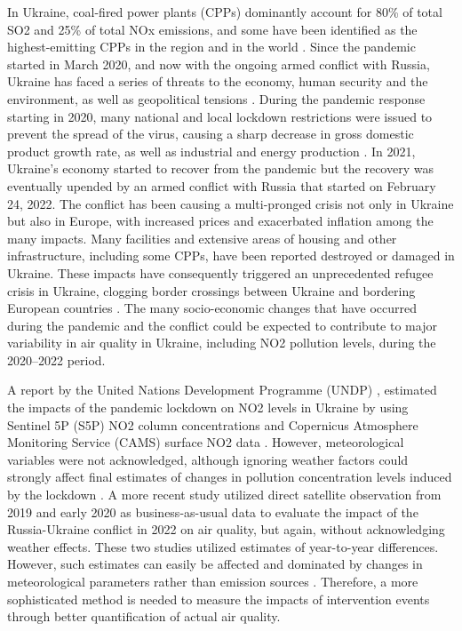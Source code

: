 In Ukraine, coal-fired power plants (CPPs) dominantly account for 80\% of total SO2 and 25\% of total NOx emissions, and some have been identified as the highest-emitting CPPs in the region and in the world \citep{lauri2021}. Since the pandemic started in March 2020, and now with the ongoing armed conflict with Russia, Ukraine has faced a series of threats to the economy, human security and the environment, as well as geopolitical tensions \citep{pereira2022russian}. During the pandemic response starting in 2020, many national and local lockdown restrictions were issued to prevent the spread of the virus, causing a sharp decrease in gross domestic product growth rate, as well as industrial and energy production \citep{danylyshyn2020peculiarities}. In 2021, Ukraine’s economy started to recover from the pandemic but the recovery was eventually upended by an armed conflict with Russia that started on February 24, 2022. The conflict has been causing a multi-pronged crisis not only in Ukraine but also in Europe, with increased prices and exacerbated inflation among the many impacts. Many facilities and extensive areas of housing and other infrastructure, including some CPPs, have been reported destroyed or damaged in Ukraine. These impacts have consequently triggered an unprecedented refugee crisis in Ukraine, clogging border crossings between Ukraine and bordering European countries \citep{julia2022}. The many socio-economic changes that have occurred during the pandemic and the conflict could be expected to contribute to major variability in air quality in Ukraine, including NO2 pollution levels, during the 2020–2022 period. \par
A report by the United Nations Development Programme (UNDP) \citep{dumitru2020}, estimated the impacts of the pandemic lockdown on NO2 levels in Ukraine by using Sentinel 5P (S5P) NO2 column concentrations and Copernicus Atmosphere Monitoring Service (CAMS) surface NO2 data \citep{marecal2015regional}. However, meteorological variables were not acknowledged, although ignoring weather factors could strongly affect final estimates of changes in pollution concentration levels induced by the lockdown \citep{schiermeier2020pollution}. A more recent study \citep{zalakeviciute2022war} utilized direct satellite observation from 2019 and early 2020 as business-as-usual data to evaluate the impact of the Russia-Ukraine conflict in 2022 on air quality, but again, without acknowledging weather effects. These two studies utilized estimates of year-to-year differences. However, such estimates can easily be affected and dominated by changes in meteorological parameters rather than emission sources \citep{grange2021covid,shi2021abrupt}. Therefore, a more sophisticated method is needed to measure the impacts of intervention events through better quantification of actual air quality. \par
